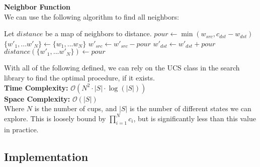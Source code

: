 \textbf{Neighbor Function}\\
We can use the following algorithm to find all neighbors:
\begin{algorithmic}
  \State Let $distance$ be a map of neighbors to distance.
        \State $pour \gets \min(w_{src}, c_{dst} - w_{dst})$
          \State $\{w'_{1}, ... w'_{N}\} \gets \{w_{1}, ... w_{N}\}$
          \State $w'_{src} \gets w'_{src} - pour$
          \State $w'_{dst} \gets w'_{dst} + pour$
          \State $distance (\{w'_{1}, ... w'_{N}\}) \gets pour$
        \EndIf
      \EndIf
    \EndFor
  \EndFor
\end{algorithmic}
With all of the following defined, we can rely on the UCS class in the search
library to find the optimal procedure, if it exists.\\
\hfill\break
\textbf{Time Complexity:} $\mathcal{O}(N^2 \cdot |S| \cdot \log(|S|))$\\
\textbf{Space Complexity:} $\mathcal{O}(|S|)$\\
Where $N$ is the number of cups, and $|S|$ is the number of different states
we can explore. This is loosely bound by ${\displaystyle \prod_{i=1}^{N} c_{i}}$,
but is significantly less than this value in practice.
\subsection{Implementation}

\pagebreak

\pagebreak
